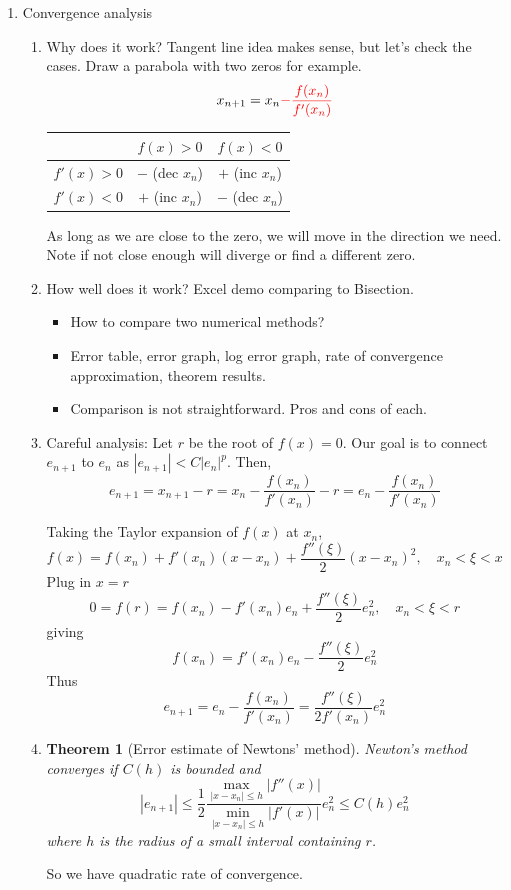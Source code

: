 \documentclass{article}
\newtheorem{thm}{Theorem}[section]
\theoremstyle{remark}
\begin{document}
\begin{enumerate}
\item Convergence analysis
\begin{enumerate}
\item Why does it work? Tangent line idea makes sense, but let's check the cases. Draw a parabola with two zeros for example.
$$
x_{n+1} = x_n{\color{red} - \frac{f(x_n)}{f'(x_n)}}
$$
\begin{center}
\begin{tabular}{|c|c|c|}\hline
& $f(x) > 0$ & $f(x) <0$\\\hline
 $f'(x) > 0$ &$-$ (dec $x_n$) & $+$ (inc $x_n$) \\\hline
 $f'(x) < 0$ &$+$ (inc $x_n$) & $-$ (dec $x_n$)\\\hline
\end{tabular}
\end{center}
As long as we are close to the zero, we will move in the direction we need. Note if not close enough will diverge or find a different zero.

\item How well does it work? Excel demo comparing to Bisection.
\begin{itemize}
\item How to compare two numerical methods?
\item Error table, error graph, log error graph, rate of convergence approximation, theorem results. 
\item Comparison is not straightforward. Pros and cons of each.
\end{itemize}

\item Careful analysis: Let $r$ be the root of $f(x) = 0$. Our goal is to connect $e_{n+1}$ to $e_n$ as $|e_{n+1}|<C|e_n|^p$. Then,
$$
e_{n+1} = x_{n+1} -r = x_n - \frac{f(x_n)}{f'(x_n)}-r = e_n -\frac{f(x_n)}{f'(x_n)}
$$

Taking the Taylor expansion of $f(x)$ at $x_n$,
$$
 f(x)  = f(x_n)+f'(x_n)(x-x_n)+\frac{f''(\xi)}{2}(x-x_n)^2,\quad x_n <\xi<x
$$
Plug in $x = r$
$$
0 = f(r) = f(x_n)-f'(x_n)e_n+\frac{f''(\xi)}{2}e_n^2, \quad x_n <\xi<r
$$
giving 
\[
f(x_n)=f'(x_n)e_n-\frac{f''(\xi)}{2}e_n^2
\]
Thus
$$
e_{n+1} = e_n -\frac{f(x_n)}{f'(x_n)} = \frac{f''(\xi)}{2f'(x_n)} e_n^2
$$
\item 
\begin{thm}[Error estimate of Newtons' method]
Newton's method converges if $C(h)$ is bounded and
$$
|e_{n+1}| \leq \frac{1}{2}\frac{\displaystyle\max_{|x-x_n|\leq h}|f''(x)|}{\displaystyle\min_{|x-x_n|\leq h}|f'(x)|} e_n^2 \leq C(h)e_n^2
$$
where $h$ is the radius of a small interval containing $r$.
\end{thm}
So we have quadratic rate of convergence.
\end{enumerate}


\end{enumerate}
\end{document}
